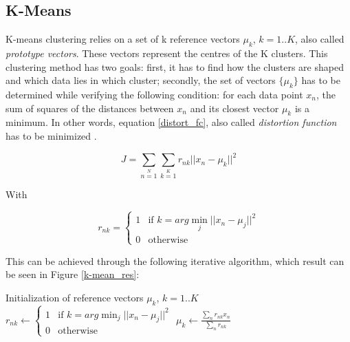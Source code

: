 \subsection{K-Means}

\vspace{\baselineskip}
\noindent K-means clustering relies on a set of k reference vectors $\mu_k$, $k=1..K$, also called \textit{prototype vectors}. These vectors represent the centres of the K clusters. This clustering method has two goals: first, it has to find how the clusters are shaped and which data lies in which cluster; secondly, the set of vectors $\{\mu_k\}$ has to be determined while verifying the following condition: for each data point $x_n$, the sum of squares of the distances between $x_n$ and its closest vector $\mu_k$ is a minimum. In other words, equation \ref{distort_fc}, also called \textit{distortion function} has to be minimized \cite{BIS06}.

\begin{equation}
J = \sum\limits_{n=1}\limits^{N} \sum\limits_{k=1}\limits^{K} r_{nk} ||x_n - \mu_k||^2
\label{distort_fc}
\end{equation}

\noindent With

\begin{equation*}
r_{nk} = \left\{
	\begin{array}{ll}
		1 & \mbox{if }  k = arg \min_j ||x_n - \mu_j||^2 \\
		0 & \mbox{otherwise}
	\end{array}
\right.
\end{equation*}
\vspace{\baselineskip}

\noindent This can be achieved through the following iterative algorithm, which result can be seen in Figure \ref{k-mean_res}:
\newline

\begin{algorithmic}
\State Initialization of reference vectors $\mu_k$, $k = 1..K$ 
\Repeat	
		\State \begin{math} 
			r_{nk} \gets \left\{
			\begin{array}{ll}
				1 & \mbox{if }  k = arg \min_j ||x_n - \mu_j||^2 \\
				0 & \mbox{otherwise}
			\end{array}
			\right.
			\end{math}
	\EndFor
		\State $\mu_k \gets \frac{\sum\limits_n r_{nk}x_n}{\sum\limits_n r_{nk}}$
	\EndFor
{}
\end{algorithmic}

